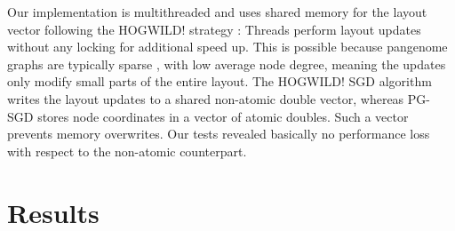 \documentclass{bioinfo}
\theoremstyle{definition}
\begin{document}
	Our implementation is multithreaded and uses shared memory for the layout vector following the HOGWILD! strategy \citep{Recht2011}: Threads perform layout updates without any locking for additional speed up.
	This is possible because pangenome graphs are typically sparse \citep{Guarracino2022}, with low average node degree, meaning the updates only modify small parts of the entire layout.
	The HOGWILD! SGD algorithm writes the layout updates to a shared non-atomic double vector, whereas PG-SGD stores node coordinates in a vector of atomic doubles.
	Such a vector prevents memory overwrites. Our tests revealed basically no performance loss with respect to the non-atomic counterpart.
	
    \iffalse
    Fig. 1: Describe how our approach works, especially a single update operation (Fig. \ref{fig:sketches}). Explanation of 1D graph updating in Figures \ref{fig:1d_before_update}-\ref{fig:1d_after_update}. Explanation of 2D graph updating in Figures \ref{fig:2d_before_update}-\ref{fig:2d_after_update}. Zipf distribution.

    
    \fi

    \section{Results}
    \label{sec:results}
\end{document}
